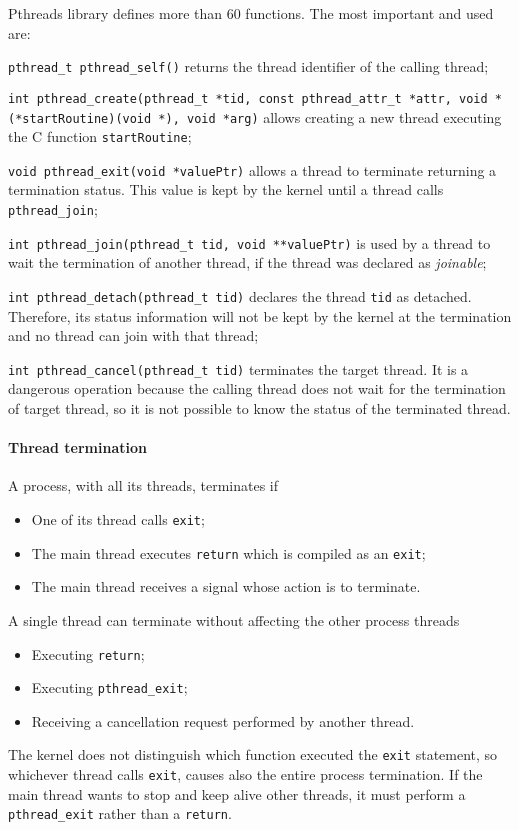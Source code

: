 Pthreads library defines more than 60 functions. The most important and used are:
\begin{description}
\item \texttt{pthread\_t pthread\_self()} returns the thread identifier of the calling thread;
\item \texttt{int pthread\_create(pthread\_t *tid, const pthread\_attr\_t *attr, \newline void *(*startRoutine)(void *), void *arg)} allows creating a new thread executing the C function \texttt{startRoutine};
\item \texttt{void pthread\_exit(void *valuePtr)} allows a thread to terminate returning a termination status. This value is kept by the kernel until a thread calls \texttt{pthread\_join};
\item \texttt{int pthread\_join(pthread\_t tid, void **valuePtr)} is used by a thread to wait the termination of another thread, if the thread was declared as \emph{joinable};
\item \texttt{int pthread\_detach(pthread\_t tid)} declares the thread \texttt{tid} as detached. Therefore, its status information will not be kept by the kernel at the termination and no thread can join with that thread;
\item \texttt{int pthread\_cancel(pthread\_t tid)} terminates the target thread. It is a dangerous operation because the calling thread does not wait for the termination of target thread, so it is not possible to know the status of the terminated thread.
\end{description}

\paragraph{Thread termination}
A process, with all its threads, terminates if
\begin{itemize}
\item One of its thread calls \texttt{exit};
\item The main thread executes \texttt{return} which is compiled as an \texttt{exit};
\item The main thread receives a signal whose action is to terminate.
\end{itemize}
A single thread can terminate without affecting the other process threads
\begin{itemize}
\item Executing \texttt{return};
\item Executing \texttt{pthread\_exit};
\item Receiving a cancellation request performed by another thread.
\end{itemize}

The kernel does not distinguish which function executed the \texttt{exit} statement, so whichever thread calls \texttt{exit}, causes also the entire process termination. If the main thread wants to stop and keep alive other threads, it must perform a \texttt{pthread\_exit} rather than a \texttt{return}.
